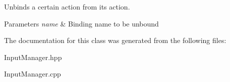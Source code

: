 Unbinds a certain action from its action. 


\begin{DoxyParams}{Parameters}
{\em name} & Binding name to be unbound \\
\hline
\end{DoxyParams}


The documentation for this class was generated from the following files\+:\begin{DoxyCompactItemize}
\item 
Input\+Manager.\+hpp\item 
Input\+Manager.\+cpp\end{DoxyCompactItemize}

